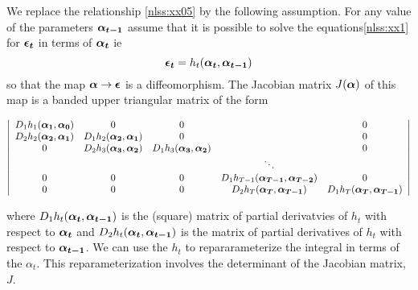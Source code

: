 %
We replace the relationship
\ref{nlss:xx05} by the following assumption.
For any value of the parameters $\boldsymbol{\alpha_{t-1}}$
assume that it is possible to solve the  equations\ref{nlss:xx1}
for  $\boldsymbol{\epsilon_t}$ in terms of $\boldsymbol{\alpha_t}$ ie
\begin{equation}
 {\boldsymbol{\epsilon_t}=h_t(\boldsymbol{\alpha_t},\boldsymbol{\alpha_{t-1}})}\label{nlss:xx3}
\end{equation}
so that the map $\boldsymbol{\alpha} \rightarrow \boldsymbol{\epsilon}$  
is a diffeomorphism. The Jacobian matrix $J(\boldsymbol{\alpha})$ of this map
is a banded upper triangular matrix of the form

\[
\left | \begin{array}{ccccc}
   D_1h_1(\boldsymbol{\alpha_1},\boldsymbol{\alpha_0}) & 0  & 0 &  & 0 \\
   D_2h_2(\boldsymbol{\alpha_2},\boldsymbol{\alpha_1}) & D_1h_2(\boldsymbol{\alpha_2},\boldsymbol{\alpha_1})  & 0  & & 0  \\ 
     0                    &  D_2h_3(\boldsymbol{\alpha_3},\boldsymbol{\alpha_2})    &  D_1h_3(\boldsymbol{\alpha_3},\boldsymbol{\alpha_2})  & & 0\\
                          &                           &                & \ddots \\
     0                    & 0                         &    0           &  D_1h_{T-1}(\boldsymbol{\alpha_{T-1}},\boldsymbol{\alpha_{T-2}})           & 0 \\
     0                    & 0                         &    0           &  D_2h_T(\boldsymbol{\alpha_T},\boldsymbol{\alpha_{T-1}})  & D_1h_T(\boldsymbol{\alpha_T},\boldsymbol{\alpha_{T-1}}) 
 
   \end{array}
  \right |
\]


%  
% 
where $D_1h_t(\boldsymbol{\alpha_t},\boldsymbol{\alpha_{t-1}})$ is the (square) matrix of partial derivatvies of $h_t$ with respect to  $\boldsymbol{\alpha_t}$ and 
 $D_2h_t(\boldsymbol{\alpha_t},\boldsymbol{\alpha_{t-1}})$ is the matrix of partial derivatives 
of $h_t$ with respect to  $\boldsymbol{\alpha_{t-1}}$. 
We can use the $h_t$  to
repararameterize the integral  in terms of the $\alpha_t$. 
This reparameterization involves the determinant of the Jacobian matrix, $J$.
 
